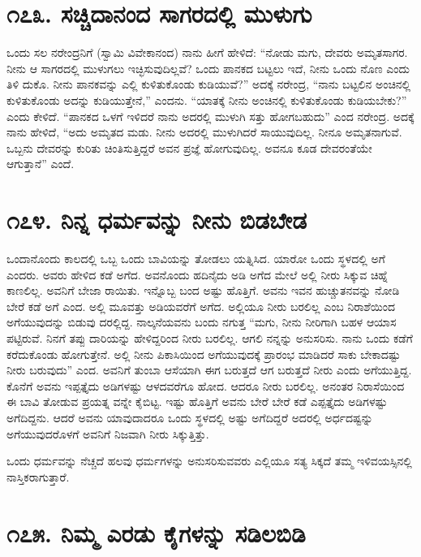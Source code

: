 \section{\num{೧೭೩. } ಸಚ್ಚಿದಾನಂದ ಸಾಗರದಲ್ಲಿ ಮುಳುಗು}

ಒಂದು ಸಲ ನರೇಂದ್ರನಿಗೆ (ಸ್ವಾಮಿ ವಿವೇಕಾನಂದ) ನಾನು ಹೀಗೆ ಹೇಳಿದೆ: “ನೋಡು ಮಗು, ದೇವರು ಅಮೃತಸಾಗರ. ನೀನು ಆ ಸಾಗರದಲ್ಲಿ ಮುಳುಗಲು ಇಚ್ಛಿಸುವುದಿಲ್ಲವೆ? ಒಂದು ಪಾನಕದ ಬಟ್ಟಲು ಇದೆ, ನೀನು ಒಂದು ನೊಣ ಎಂದು ತಿಳಿ ದುಕೊ. ನೀನು ಪಾನಕವನ್ನು ಎಲ್ಲಿ ಕುಳಿತುಕೊಂಡು ಕುಡಿಯುವೆ?” ಅದಕ್ಕೆ ನರೇಂದ್ರ, “ನಾನು ಬಟ್ಟಲಿನ ಅಂಚಿನಲ್ಲಿ ಕುಳಿತುಕೊಂಡು ಅದನ್ನು ಕುಡಿಯುತ್ತೇನೆ,” ಎಂದನು. “ಯಾತಕ್ಕೆ ನೀನು ಅಂಚಿನಲ್ಲಿ ಕುಳಿತುಕೊಂಡು ಕುಡಿಯಬೇಕು?” ಎಂದು ಕೇಳಿದೆ. “ಪಾನಕದ ಒಳಗೆ ಇಳಿದರೆ ನಾನು ಅದರಲ್ಲಿ ಮುಳುಗಿ ಸತ್ತು ಹೋಗಬಹುದು” ಎಂದ ನರೇಂದ್ರ. ಅದಕ್ಕೆ ನಾನು ಹೇಳಿದೆ, “ಅದು ಅಮೃತದ ಮಡು. ನೀನು ಅದರಲ್ಲಿ ಮುಳುಗಿದರೆ ಸಾಯುವುದಿಲ್ಲ. ನೀನೂ ಅಮೃತನಾಗುವೆ. ಒಬ್ಬನು ದೇವರನ್ನು ಕುರಿತು ಚಿಂತಿಸುತ್ತಿದ್ದರೆ ಅವನ ಪ್ರಜ್ಞೆ ಹೋಗುವುದಿಲ್ಲ. ಅವನೂ ಕೂಡ ದೇವರಂತೆಯೇ ಆಗುತ್ತಾನೆ” ಎಂದೆ.


\section{\num{೧೭೪. } ನಿನ್ನ ಧರ್ಮವನ್ನು ನೀನು ಬಿಡಬೇಡ}

ಒಂದಾನೊಂದು ಕಾಲದಲ್ಲಿ ಒಬ್ಬ ಒಂದು ಬಾವಿಯನ್ನು ತೋಡಲು ಯತ್ನಿಸಿದ. ಯಾರೋ ಒಂದು ಸ್ಥಳದಲ್ಲಿ ಅಗೆ ಎಂದರು. ಅವರು ಹೇಳಿದ ಕಡೆ ಅಗೆದ. ಅವನೊಂದು ಹದಿನೈದು ಅಡಿ ಅಗೆದ ಮೇಲೆ ಅಲ್ಲಿ ನೀರು ಸಿಕ್ಕುವ ಚಿಹ್ನೆ ಕಾಣಲಿಲ್ಲ. ಅವನಿಗೆ ಬೇಜಾ ರಾಯಿತು. ಇನ್ನೊಬ್ಬ ಬಂದ ಅಷ್ಟು ಹೊತ್ತಿಗೆ. ಅವನು ಇವನ ಹುಚ್ಚುತನವನ್ನು ನೋಡಿ ಬೇರೆ ಕಡೆ ಅಗೆ ಎಂದ. ಅಲ್ಲಿ ಮೂವತ್ತು ಅಡಿಯವರೆಗೆ ಅಗೆದ. ಅಲ್ಲಿಯೂ ನೀರು ಬರಲಿಲ್ಲ ಎಂಬ ನಿರಾಶೆಯಿಂದ ಅಗೆಯುವುದನ್ನು ಬಿಡುವು ದರಲ್ಲಿದ್ದ. ನಾಲ್ಕನೆಯವನು ಬಂದು ನಗುತ್ತ “ಮಗು, ನೀನು ನೀರಿಗಾಗಿ ಬಹಳ ಆಯಾಸ ಪಟ್ಟಿರುವೆ. ನಿನಗೆ ತಪ್ಪು ದಾರಿಯನ್ನು ಹೇಳಿದ್ದರಿಂದ ನೀರು ಬರಲಿಲ್ಲ. ಆಗಲಿ ನನ್ನನ್ನು ಅನುಸರಿಸು. ನಾನು ಒಂದು ಕಡೆಗೆ ಕರೆದುಕೊಂಡು ಹೋಗುತ್ತೇನೆ. ಅಲ್ಲಿ ನೀನು ಪಿಕಾಸಿಯಿಂದ ಅಗೆಯುವುದಕ್ಕೆ ಪ್ರಾರಂಭ ಮಾಡಿದರೆ ಸಾಕು ಬೇಕಾದಷ್ಟು ನೀರು ಬರುವುದು” ಎಂದ. ಅವನಿಗೆ ತುಂಬಾ ಆಸೆಯಾಗಿ ಈಗ ಬರುತ್ತದೆ ಆಗ ಬರುತ್ತದೆ ನೀರು ಎಂದು ಅಗೆಯುತ್ತಿದ್ದ. ಕೊನೆಗೆ ಅವನು ಇಪ್ಪತ್ತೈದು ಅಡಿಗಳಷ್ಟು ಆಳದವರೆಗೂ ಹೋದ. ಆದರೂ ನೀರು ಬರಲಿಲ್ಲ. ಅನಂತರ ನಿರಾಸೆಯಿಂದ ಈ ಬಾವಿ ತೋಡುವ ಪ್ರಯತ್ನ ವನ್ನೇ ಕೈಬಿಟ್ಟ. ಇಷ್ಟು ಹೊತ್ತಿಗೆ ಅವನು ಬೇರೆ ಬೇರೆ ಕಡೆ ಎಪ್ಪತ್ತೈದು ಅಡಿಗಳಷ್ಟು ಅಗೆದಿದ್ದನು. ಆದರೆ ಅವನು ಯಾವುದಾದರೂ ಒಂದು ಸ್ಥಳದಲ್ಲಿ ಅಷ್ಟು ಅಗೆದಿದ್ದರೆ ಅದರಲ್ಲಿ ಅರ್ಧದಷ್ಟನ್ನು ಅಗೆಯುವುದರೊಳಗೆ ಅವನಿಗೆ ನಿಜವಾಗಿ ನೀರು ಸಿಕ್ಕುತ್ತಿತ್ತು.

ಒಂದು ಧರ್ಮವನ್ನು ನೆಚ್ಚದೆ ಹಲವು ಧರ್ಮಗಳನ್ನು ಅನುಸರಿಸುವವರು ಎಲ್ಲಿಯೂ ಸತ್ಯ ಸಿಕ್ಕದೆ ತಮ್ಮ ಇಳಿವಯಸ್ಸಿನಲ್ಲಿ ನಾಸ್ತಿಕರಾಗುತ್ತಾರೆ.


\section{\num{೧೭೫. } ನಿಮ್ಮ ಎರಡು ಕೈಗಳನ್ನು ಸಡಿಲಬಿಡಿ}

